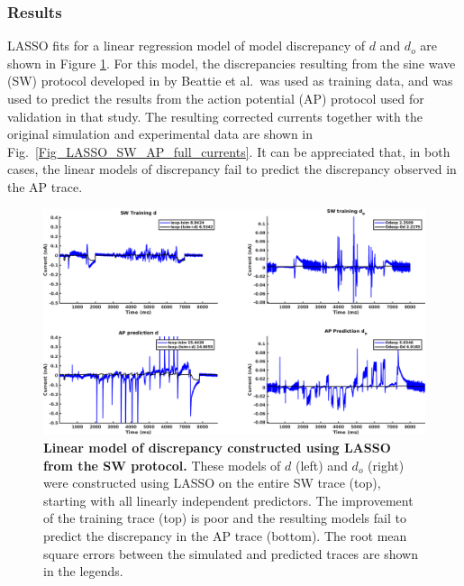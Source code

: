 \documentclass[11pt,a4paper,oneside]{article}
\begin{document}
\subsubsection{Results}

LASSO fits for a linear regression model of model discrepancy of $d$ and $d_o$ are shown in Figure \ref{Fig_LASSO_SW_AP_full_discrepancy}. For this model, the discrepancies resulting from the sine wave (SW) protocol developed in by Beattie et al.~was used as training data, and was used to predict the results from the action potential (AP) protocol used for validation in that study. The resulting corrected currents together with the original simulation and experimental data are shown in Fig.~\ref{Fig_LASSO_SW_AP_full_currents}. It can be appreciated that, in both cases, the linear models of discrepancy fail to predict the discrepancy observed in the AP trace.

\begin{figure}[t]
\begin{center}
\includegraphics[scale=0.42]{Figures/LASSO_SW_AP_full_discrepancy.png}
\caption{\textbf{Linear model of discrepancy constructed using LASSO from the SW protocol.} These models of $d$ (left) and $d_o$ (right) were constructed using LASSO on the entire SW trace (top), starting with all linearly independent predictors. The improvement of the training trace (top) is poor and the resulting models fail to predict the discrepancy in the AP trace (bottom). The root mean square errors between the simulated and predicted traces are shown in the legends. } 
\label{Fig_LASSO_SW_AP_full_discrepancy}
\end{center}
\end{figure}
\end{document}
